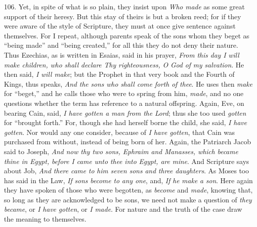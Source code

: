 106. Yet, in spite of what is
so plain, they insist upon \emph{Who made} as some great support of
their heresy. But this stay of theirs is but a broken reed; for if
they were aware of the style of Scripture, they must at once give
sentence against themselves. For I repeat, although parents
speak of the sons whom they beget as ``being made'' and ``being created,''
for all this they do not deny their nature. Thus Ezechias, as is
written in Esaias, said in his prayer, \emph{From this day I will make
children, who shall declare Thy righteousness, O God of my salvation}.
He then said, \emph{I will make}; but the Prophet in that very book
and the Fourth of Kings, thus speaks, \emph{And the sons who shall come
forth of thee}. He uses then \emph{make} for ``beget,'' and he calls
those who were to spring from him, \emph{made}, and no one questions
whether the term has reference to a natural offspring. Again, Eve, on
bearing Cain, said, \emph{I have gotten a man from the Lord}; thus she
too used \emph{gotten} for ``brought forth.'' For, though she had
herself borne the child, she said, \emph{I have gotten}. Nor would any
one consider, because of \emph{I have gotten}, that Cain was purchased
from without, instead of being born of her. Again, the Patriarch Jacob
said to Joseph, \emph{And now thy two sons, Ephraim and Manasses, which
became thine in Egypt, before I came unto thee into Egypt, are mine}.
And Scripture says about Job, \emph{And there came to him seven sons and
three daughters}. As Moses too has said in the Law, \emph{If sons
become to any one}, and, \emph{If he make a son}. Here again they
have spoken of those who were begotten, as \emph{become} and \emph{made},
knowing that, so long as they are acknowledged to be sons, we need not
make a question of \emph{they became}, or \emph{I have gotten}, or \emph{I
made}. For nature and the truth of the case draw the meaning to
themselves.

